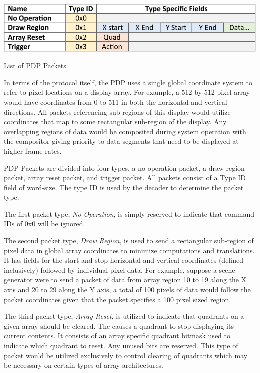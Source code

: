    \begin{table}
        \centering
        \includegraphics[width=1.0\textwidth]{fig/packet_chart.pdf}
        \caption{List of PDP Packets}
        \label{tbl:packets}
    \end{table}

    In terms of the protocol itself, the PDP uses a single global coordinate system to refer to pixel locations on a display array. For example, a 512 by 512-pixel array would have coordinates from 0 to 511 in both the horizontal and vertical directions. All packets referencing sub-regions of this display would utilize coordinates that map to some rectangular sub-region of the display. Any overlapping regions of data would be composited during system operation with the compositor giving priority to data segments that need to be displayed at higher frame rates.

    PDP Packets are divided into four types, a no operation packet, a draw region packet, array reset packet, and trigger packet. All packets consist of a Type ID field of word-size. The type ID is used by the decoder to determine the packet type.

    The first packet type, {\it No Operation}, is simply reserved to indicate that command IDs of 0x0 will be ignored.

    The second packet type, {\it Draw Region}, is used to send a rectangular sub-region of pixel data in global array coordinates to minimize computations and translations. It has fields for the start and stop horizontal and vertical coordinates (defined inclusively) followed by individual pixel data. For example, suppose a scene generator were to send a packet of data from array region 10 to 19 along the X axis and 20 to 29 along the Y axis, a total of 100 pixels of data would follow the packet coordinates given that the packet specifies a 100 pixel sized region.

    The third packet type, {\it Array Reset}, is utilized to indicate that quadrants on a given array should be cleared. The causes a quadrant to stop displaying its current contents. It consists of an array specific quadrant bitmask used to indicate which quadrant to reset. Any unused bits are reserved. This type of packet would be utilized exclusively to control clearing of quadrants which may be necessary on certain types of array architectures.

